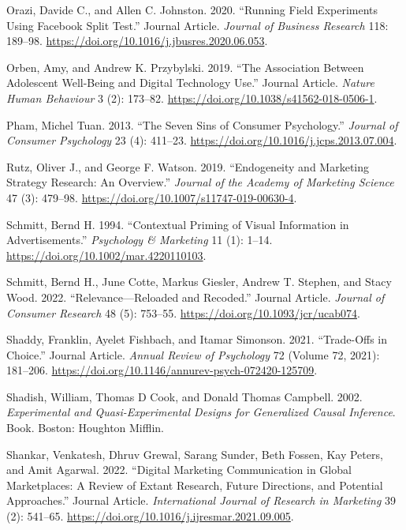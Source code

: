\documentclass[
  a4paper,
]{scrreprt}
\newlength{\cslhangindent}
\newlength{\cslentryspacingunit} %
\newenvironment{CSLReferences}[2] %
 {%
  \setlength{\parindent}{0pt}
  \ifodd #1
  \let\oldpar\par
  \def\par{\hangindent=\cslhangindent\oldpar}
  \fi
  \setlength{\parskip}{#2\cslentryspacingunit}
 }%
 {}
\begin{document}
\begin{CSLReferences}{1}{0}
\leavevmode{}%
Orazi, Davide C., and Allen C. Johnston. 2020. {``Running Field
Experiments Using Facebook Split Test.''} Journal Article. \emph{Journal
of Business Research} 118: 189--98.
\url{https://doi.org/10.1016/j.jbusres.2020.06.053}.

\leavevmode{}%
Orben, Amy, and Andrew K. Przybylski. 2019. {``The Association Between
Adolescent Well-Being and Digital Technology Use.''} Journal Article.
\emph{Nature Human Behaviour} 3 (2): 173--82.
\url{https://doi.org/10.1038/s41562-018-0506-1}.

\leavevmode{}%
Pham, Michel Tuan. 2013. {``The Seven Sins of Consumer Psychology.''}
\emph{Journal of Consumer Psychology} 23 (4): 411--23.
\url{https://doi.org/10.1016/j.jcps.2013.07.004}.

\leavevmode{}%
Rutz, Oliver J., and George F. Watson. 2019. {``Endogeneity and
Marketing Strategy Research: An Overview.''} \emph{Journal of the
Academy of Marketing Science} 47 (3): 479--98.
\url{https://doi.org/10.1007/s11747-019-00630-4}.

\leavevmode{}%
Schmitt, Bernd H. 1994. {``Contextual Priming of Visual Information in
Advertisements.''} \emph{Psychology \& Marketing} 11 (1): 1--14.
\url{https://doi.org/10.1002/mar.4220110103}.

\leavevmode{}%
Schmitt, Bernd H., June Cotte, Markus Giesler, Andrew T. Stephen, and
Stacy Wood. 2022. {``Relevance---Reloaded and Recoded.''} Journal
Article. \emph{Journal of Consumer Research} 48 (5): 753--55.
\url{https://doi.org/10.1093/jcr/ucab074}.

\leavevmode{}%
Shaddy, Franklin, Ayelet Fishbach, and Itamar Simonson. 2021.
{``Trade-Offs in Choice.''} Journal Article. \emph{Annual Review of
Psychology} 72 (Volume 72, 2021): 181--206.
\url{https://doi.org/10.1146/annurev-psych-072420-125709}.

\leavevmode{}%
Shadish, William, Thomas D Cook, and Donald Thomas Campbell. 2002.
\emph{Experimental and Quasi-Experimental Designs for Generalized Causal
Inference}. Book. Boston: Houghton Mifflin.

\leavevmode{}%
Shankar, Venkatesh, Dhruv Grewal, Sarang Sunder, Beth Fossen, Kay
Peters, and Amit Agarwal. 2022. {``Digital Marketing Communication in
Global Marketplaces: A Review of Extant Research, Future Directions, and
Potential Approaches.''} Journal Article. \emph{International Journal of
Research in Marketing} 39 (2): 541--65.
\url{https://doi.org/10.1016/j.ijresmar.2021.09.005}.


\end{CSLReferences}
\end{document}
